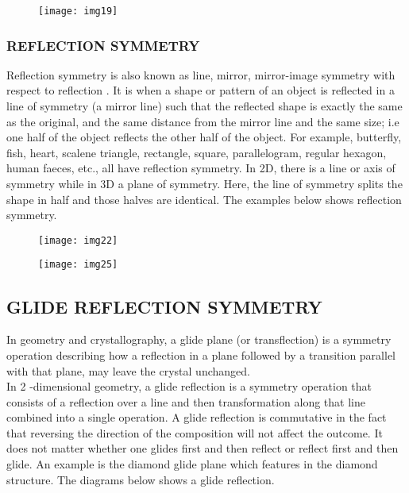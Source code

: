 \documentclass[a4paper, 12pt, openany]{report}
\begin{document}
	
		\begin{figure}[H] \centering \texttt{[image: img19]} \hspace{0.05cm} \end{figure} 
	
	 \subsubsection*{REFLECTION SYMMETRY}
	 Reflection symmetry is also known as line, mirror, mirror-image symmetry with respect to reflection . It is when a shape or pattern  of an object is reflected in a line of symmetry (a mirror line) such that the reflected shape is exactly the same as the original, and the same distance from the mirror line and the same size; i.e one half of the object reflects the other half of the object. For example, butterfly, fish, heart, scalene triangle, rectangle, square, parallelogram, regular hexagon, human faeces, etc., all have reflection symmetry. In 2D, there is a line or axis of symmetry while in 3D a plane of symmetry. Here, the line of symmetry splits the shape in half and those halves are identical. The examples below shows reflection symmetry.
\begin{figure}[H] \centering \texttt{[image: img22]}  \end{figure} 
\begin{figure}[H] \centering \texttt{[image: img25]}  \end{figure} 
	 
	 \subsection*{GLIDE REFLECTION SYMMETRY}
	 In geometry and crystallography, a glide plane (or transflection) is a \break symmetry operation describing how a reflection in a plane followed by a transition parallel with that plane, may leave the crystal unchanged.\\
	 In 2 -dimensional geometry, a glide reflection is a symmetry operation that consists of a reflection over a line and then transformation  along that  line combined into a single operation. A glide reflection is commutative in the fact that reversing the direction of the composition will not affect the \break outcome. It does not matter whether one glides first  and then reflect or reflect first and then glide. An example is the diamond glide plane which features in the diamond structure. The diagrams below shows a glide \break reflection.
	 
\end{document}
